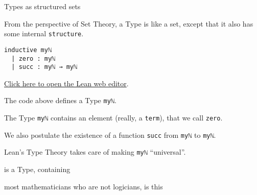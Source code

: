 \documentclass{beamer}
\begin{document}
\begin{frame}[fragile]{Types as structured sets}

From the perspective of Set Theory, a Type is like a set, except that it also has some internal {\color{purple}\verb`structure`}.

\begin{verbatim}
inductive myℕ
  | zero : myℕ
  | succ : myℕ → myℕ
\end{verbatim}
{\small{\href{https://leanprover-community.github.io/lean-web-editor/#code=inductive%20my%E2%84%95%0A%20%20%7C%20zero%20%3A%20my%E2%84%95%0A%20%20%7C%20succ%20%3A%20my%E2%84%95%20%E2%86%92%20my%E2%84%95%0A%0A%23print%20prefix%20my%E2%84%95%0A}{Click here to open the Lean web editor}.}}
\bigskip

The code above defines a Type {\color{purple}\verb`myℕ`}.
\bigskip

The Type {\color{purple}\verb`myℕ`} contains an element (really, a {\color{purple}\verb`term`}), that we call {\color{purple}\verb`zero`}.
\bigskip

We also postulate the existence of a function {\color{purple}\verb`succ`} from {\color{purple}\verb`myℕ`} to {\color{purple}\verb`myℕ`}.
\bigskip

Lean's Type Theory takes care of making {\color{purple}\verb`myℕ`} ``universal''.
\end{frame}

\begin{frame}[fragile]

 is a Type, containing

 most mathematicians who are not logicians, is this
\end{frame}
\end{document}
